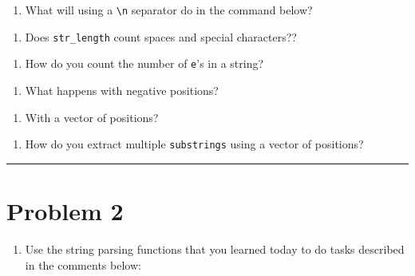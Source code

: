 \documentclass[
]{book}
\providecommand{\tightlist}{%
  \setlength{\itemsep}{0pt}\setlength{\parskip}{0pt}}
\begin{document}
\begin{enumerate}
\def\labelenumi{\alph{enumi}.}
\setcounter{enumi}{3}
\tightlist
\item
  What will using a \texttt{\textbackslash{}n} separator do in the command below?
\end{enumerate}

\begin{enumerate}
\def\labelenumi{\alph{enumi}.}
\setcounter{enumi}{4}
\tightlist
\item
  Does \texttt{str\_length} count spaces and special characters??
\end{enumerate}

\begin{enumerate}
\def\labelenumi{\alph{enumi}.}
\setcounter{enumi}{5}
\tightlist
\item
  How do you count the number of \texttt{e}'s in a string?
\end{enumerate}

\begin{enumerate}
\def\labelenumi{\alph{enumi}.}
\setcounter{enumi}{6}
\tightlist
\item
  What happens with negative positions?
\end{enumerate}

\begin{enumerate}
\def\labelenumi{\roman{enumi}.}
\tightlist
\item
  With a vector of positions?
\end{enumerate}

\begin{enumerate}
\def\labelenumi{\alph{enumi}.}
\setcounter{enumi}{9}
\tightlist
\item
  How do you extract multiple \texttt{substrings} using a vector of positions?
\end{enumerate}

\begin{center}\rule{0.5\linewidth}{0.5pt}\end{center}

\hypertarget{problem-2}{%
\section{Problem 2}\label{problem-2}}

\begin{enumerate}
\def\labelenumi{\alph{enumi}.}
\tightlist
\item
  Use the string parsing functions that you learned today to do tasks described in the comments below:
\end{enumerate}
\end{document}
